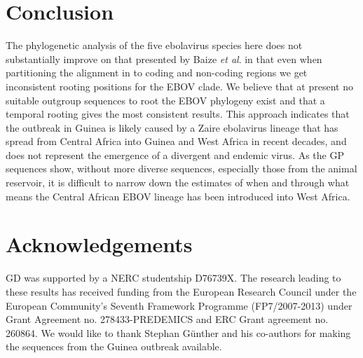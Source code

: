 \documentclass[11pt,oneside,letterpaper]{article}
\begin{document}
\section*{Conclusion}
The phylogenetic analysis of the five ebolavirus species here does not substantially improve on that presented by Baize \textit{et al}. \cite{baize2014} in that even when partitioning the alignment in to coding and non-coding regions we get inconsistent rooting positions for the EBOV clade.  
We believe that at present no suitable outgroup sequences to root the EBOV phylogeny exist and that a temporal rooting gives the most consistent results.
This approach indicates that the outbreak in Guinea is likely caused by a Zaire ebolavirus lineage that has spread from Central Africa into Guinea and West Africa in recent decades, and does not represent the emergence of a divergent and endemic virus.
As the GP sequences show, without more diverse sequences, especially those from the animal reservoir, it is difficult to narrow down the estimates of when and through what means the Central African EBOV lineage has been introduced into West Africa.

\section*{Acknowledgements}
GD was supported by a NERC studentship D76739X.
The research leading to these results has received funding from the European Research Council under the European Community's Seventh Framework Programme (FP7/2007-2013) under Grant Agreement no. 278433-PREDEMICS and ERC Grant agreement no. 260864. 
We would like to thank Stephan G\"{u}nther and his co-authors for making the sequences from the Guinea outbreak available. 




\end{document}
